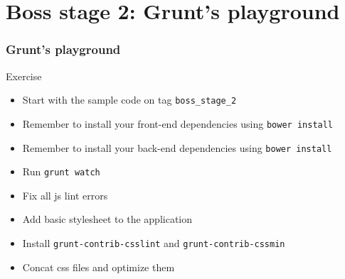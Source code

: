 \section{Boss stage 2: Grunt's playground}

\begin{frame}[fragile]
\end{frame}

\begin{frame}[fragile]
  \frametitle{Grunt's playground}
  \begin{block}{Exercise}
    \begin{itemize}
      \item Start with the sample code on tag \texttt{boss\_stage\_2}
      \item Remember to install your front-end dependencies using \texttt{bower install}
      \item Remember to install your back-end dependencies using \texttt{bower install}
      \item Run \texttt{grunt watch}
      \item Fix all js lint errors
      \item Add basic stylesheet to the application
      \item Install \texttt{grunt-contrib-csslint} and \texttt{grunt-contrib-cssmin}
      \item Concat css files and optimize them
    \end{itemize}
  \end{block}
\end{frame}
